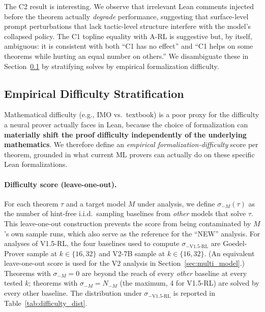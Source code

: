 \documentclass{article}
\begin{document}
The C2 result is interesting. We observe that irrelevant Lean comments injected before the theorem actually \emph{degrade} performance, suggesting that surface-level prompt perturbations that lack tactic-level structure interfere with the model's collapsed policy. The C1 topline equality with A-RL is suggestive but, by itself, ambiguous: it is consistent with both ``C1 has no effect'' and ``C1 helps on some theorems while hurting an equal number on others.'' We disambiguate these in Section~\ref{sec:difficulty} by stratifying solves by empirical formalization difficulty.

\subsection{Empirical Difficulty Stratification}
\label{sec:difficulty}

Mathematical difficulty (e.g., IMO vs.\ textbook) is a poor proxy for the difficulty a neural prover actually faces in Lean, because the choice of formalization can \textbf{materially shift the proof difficulty independently of the underlying mathematics}. We therefore define an \emph{empirical formalization-difficulty} score per theorem, grounded in what current ML provers can actually do on these specific Lean formalizations.

\paragraph{Difficulty score (leave-one-out).}
For each theorem $\tau$ and a target model $M$ under analysis, we define $\sigma_{-M}(\tau)$ as the number of hint-free i.i.d.\ sampling baselines from \emph{other} models that solve $\tau$. This leave-one-out construction prevents the score from being contaminated by $M$'s own sample runs, which also serve as the reference for the ``NEW'' analysis. For analyses of V1.5-RL, the four baselines used to compute $\sigma_{-\text{V1.5-RL}}$ are Goedel-Prover sample at $k{\in}\{16,32\}$ and V2-7B sample at $k{\in}\{16,32\}$. (An equivalent leave-one-out score is used for the V2 analysis in Section~\ref{sec:multi_model}.) Theorems with $\sigma_{-M}{=}0$ are beyond the reach of every \emph{other} baseline at every tested $k$; theorems with $\sigma_{-M}{=}N_{-M}$ (the maximum, 4 for V1.5-RL) are solved by every other baseline. The distribution under $\sigma_{-\text{V1.5-RL}}$ is reported in Table~\ref{tab:difficulty_dist}.
\end{document}
